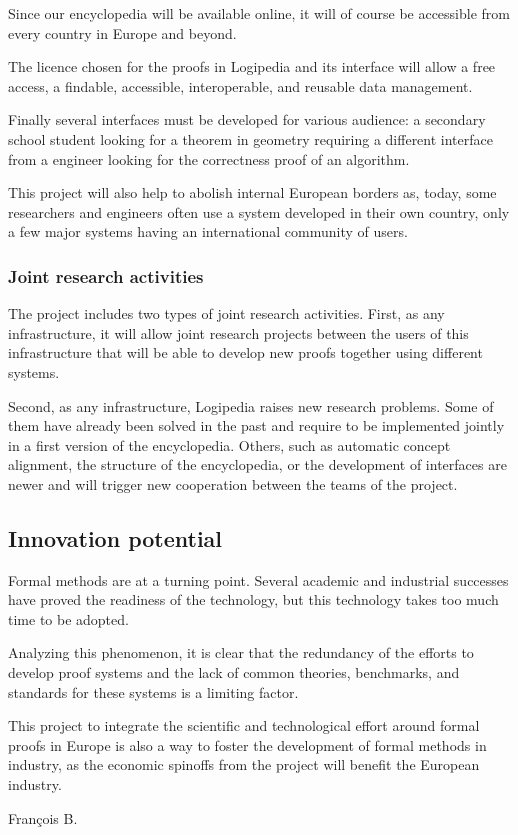 Since our encyclopedia will be available online, it will of course be
accessible from every country in Europe and beyond.

The licence chosen for the proofs in {\sc Logipedia} and its interface
will allow a free access, a findable, accessible, interoperable, and
reusable data management.

Finally several interfaces must be developed for various audience: a
secondary school student looking for a theorem in geometry requiring a
different interface from a engineer looking for the correctness proof
of an algorithm.

This project will also help to abolish internal European borders as,
today, some researchers and engineers often use a system developed in
their own country, only a few major systems having an international
community of users.

\subsubsection{Joint research activities}

The project includes two types of joint research activities.  First,
as any infrastructure, it will allow joint research projects
between the users of this infrastructure that will be able to develop
new proofs together using different systems.

Second, as any infrastructure, {\sc Logipedia} raises new research
problems. Some of them have already been solved in the past and
require to be implemented jointly in a first version of the
encyclopedia. Others, such as automatic concept alignment, the
structure of the encyclopedia, or the development of interfaces are
newer and will trigger new cooperation between the teams of the
project.

\subsection{Innovation potential}

Formal methods are at a turning point. Several academic and
industrial successes have proved the readiness of the technology, but
this technology takes too much time to be adopted.

Analyzing this phenomenon, it is clear that the redundancy of the
efforts to develop proof systems and the lack of common theories,
benchmarks, and standards for these systems is a limiting factor.

This project to integrate the scientific and technological effort
around formal proofs in Europe is also a way to foster the
development of formal methods in industry, as the economic spinoffs
from the project will benefit the European industry.

{\color{red}
François B.}


